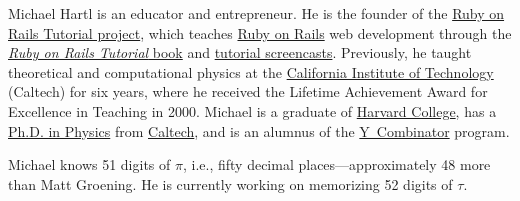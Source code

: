\documentclass{article}
\begin{document}
Michael Hartl is an educator and entrepreneur. He is the founder of the \href{http://www.railstutorial.org/}{Ruby on Rails Tutorial project}, which teaches \href{http://rubyonrails.org/}{Ruby on Rails} web development through the \href{http://www.railstutorial.org/book}{\emph{Ruby on Rails Tutorial} book} and \href{http://www.railstutorial.org/}{tutorial screencasts}. Previously, he taught theoretical and computational physics at the \href{http://www.caltech.edu/}{California Institute of Technology} (Caltech) for six years, where he received the Lifetime Achievement Award for Excellence in Teaching in 2000. Michael is a graduate of \href{http://college.harvard.edu/}{Harvard College}, has a \href{http://resolver.caltech.edu/CaltechETD:etd-05222003-161626}{Ph.D. in Physics} from \href{http://www.caltech.edu/}{Caltech}, and is an alumnus of the \href{http://ycombinator.com/}{Y~Combinator} program.

Michael knows 51 digits of $\pi$, i.e., fifty decimal places---approximately 48 more than Matt Groening. He is currently working on memorizing 52 digits of $\tau$.
\end{document}
